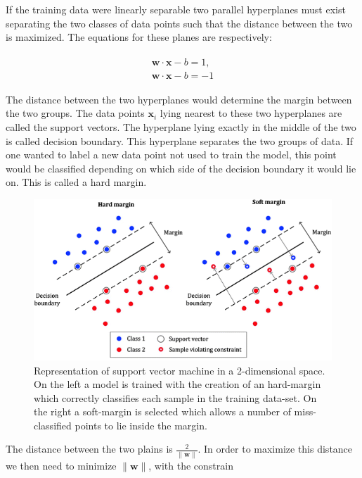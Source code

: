 If the training data were linearly separable two parallel hyperplanes must exist separating the two classes of data points such that the distance between the two is maximized. The equations for these planes are respectively:

\begin{align}
\label{eq:planes1}
	\begin{split}
	\mathbf {w}\cdot \mathbf {x}-b = 1, \\
	\mathbf {w}\cdot \mathbf {x}-b = -1
	\end{split}
\end{align}

The distance between the two hyperplanes would determine the margin between the two groups. The data points ${\mathbf {x}}_{i}$ lying nearest to these two hyperplanes are called the support vectors. The hyperplane lying exactly in the middle of the two is called decision boundary. This hyperplane separates the two groups of data. If one wanted to label a new data point not used to train the model, this point would be classified depending on which side of the decision boundary it would lie on. This is called a hard margin.

\begin{figure}[!tp]
	\centering		  
	\includegraphics[width=1.\textwidth]{figures/SVM.png}
	\caption{Representation of support vector machine in a 2-dimensional space. On the left a model is trained with the creation of an hard-margin which correctly classifies each sample in the training data-set. On the right a soft-margin is selected which allows a number of miss-classified points to lie inside the margin.}
	\label{fig:svm}
\end{figure}

The distance between the two plains is ${\frac {2}{\|{\mathbf {w}}\|}}$. In order to maximize this distance we then need to minimize $\|{\mathbf {w}}\|$, with the constrain

